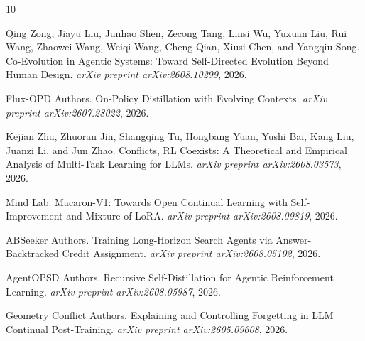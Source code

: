 \documentclass[11pt,a4paper]{article}
\begin{document}

\begin{thebibliography}{10}

Qing Zong, Jiayu Liu, Junhao Shen, Zecong Tang, Linsi Wu, Yuxuan Liu, Rui Wang, Zhaowei Wang, Weiqi Wang, Cheng Qian, Xiusi Chen, and Yangqiu Song.
\newblock Co-Evolution in Agentic Systems: Toward Self-Directed Evolution Beyond Human Design.
\newblock \emph{arXiv preprint arXiv:2608.10299}, 2026.

Flux-{OPD} Authors.
\newblock On-Policy Distillation with Evolving Contexts.
\newblock \emph{arXiv preprint arXiv:2607.28022}, 2026.

Kejian Zhu, Zhuoran Jin, Shangqing Tu, Hongbang Yuan, Yushi Bai, Kang Liu, Juanzi Li, and Jun Zhao.
 Conflicts, {RL} Coexists: A Theoretical and Empirical Analysis of Multi-Task Learning for {LLMs}.
\newblock \emph{arXiv preprint arXiv:2608.03573}, 2026.

Mind Lab.
\newblock Macaron-V1: Towards Open Continual Learning with Self-Improvement and Mixture-of-{LoRA}.
\newblock \emph{arXiv preprint arXiv:2608.09819}, 2026.

{ABSeeker} Authors.
\newblock Training Long-Horizon Search Agents via Answer-Backtracked Credit Assignment.
\newblock \emph{arXiv preprint arXiv:2608.05102}, 2026.

{AgentOPSD} Authors.
\newblock Recursive Self-Distillation for Agentic Reinforcement Learning.
\newblock \emph{arXiv preprint arXiv:2608.05987}, 2026.

Geometry Conflict Authors.
\newblock Explaining and Controlling Forgetting in {LLM} Continual Post-Training.
\newblock \emph{arXiv preprint arXiv:2605.09608}, 2026.

\end{thebibliography}
\end{document}
